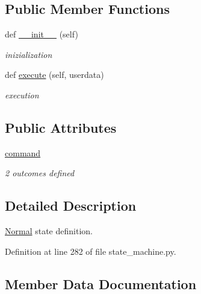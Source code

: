 \subsection*{Public Member Functions}
\begin{DoxyCompactItemize}
\item 
\mbox{\label{classstate__machine_1_1Normal_acdbc35a37d0350d7805a628048bc3bed}} 
def \hyperlink{classstate__machine_1_1Normal_acdbc35a37d0350d7805a628048bc3bed}{\+\_\+\+\_\+init\+\_\+\+\_\+} (self)
\begin{DoxyCompactList}\small\item\em inizialization \end{DoxyCompactList}\item 
\mbox{\label{classstate__machine_1_1Normal_a2930df5f4890ec4b47b2a8e18f9bff08}} 
def \hyperlink{classstate__machine_1_1Normal_a2930df5f4890ec4b47b2a8e18f9bff08}{execute} (self, userdata)
\begin{DoxyCompactList}\small\item\em execution \end{DoxyCompactList}\end{DoxyCompactItemize}
\subsection*{Public Attributes}
\begin{DoxyCompactItemize}
\item 
\hyperlink{classstate__machine_1_1Normal_af98201240ec5061a6b82b25758f6f207}{command}
\begin{DoxyCompactList}\small\item\em 2 outcomes defined \end{DoxyCompactList}\end{DoxyCompactItemize}


\subsection{Detailed Description}
\hyperlink{classstate__machine_1_1Normal}{Normal} state definition. 

Definition at line 282 of file state\+\_\+machine.\+py.



\subsection{Member Data Documentation}
\mbox{\label{classstate__machine_1_1Normal_af98201240ec5061a6b82b25758f6f207}} 
